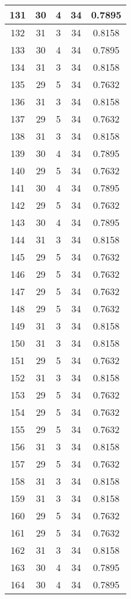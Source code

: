 \documentclass[letterpaper, 12pt]{article}
\begin{document}
\begin{longtable}{|c|c|c|c|c|}
\hline
131 & 30 & 4 & 34 & 0.7895 \\
\hline
132 & 31 & 3 & 34 & 0.8158 \\
\hline
133 & 30 & 4 & 34 & 0.7895 \\
\hline
134 & 31 & 3 & 34 & 0.8158 \\
\hline
135 & 29 & 5 & 34 & 0.7632 \\
\hline
136 & 31 & 3 & 34 & 0.8158 \\
\hline
137 & 29 & 5 & 34 & 0.7632 \\
\hline
138 & 31 & 3 & 34 & 0.8158 \\
\hline
139 & 30 & 4 & 34 & 0.7895 \\
\hline
140 & 29 & 5 & 34 & 0.7632 \\
\hline
141 & 30 & 4 & 34 & 0.7895 \\
\hline
142 & 29 & 5 & 34 & 0.7632 \\
\hline
143 & 30 & 4 & 34 & 0.7895 \\
\hline
144 & 31 & 3 & 34 & 0.8158 \\
\hline
145 & 29 & 5 & 34 & 0.7632 \\
\hline
146 & 29 & 5 & 34 & 0.7632 \\
\hline
147 & 29 & 5 & 34 & 0.7632 \\
\hline
148 & 29 & 5 & 34 & 0.7632 \\
\hline
149 & 31 & 3 & 34 & 0.8158 \\
\hline
150 & 31 & 3 & 34 & 0.8158 \\
\hline
151 & 29 & 5 & 34 & 0.7632 \\
\hline
152 & 31 & 3 & 34 & 0.8158 \\
\hline
153 & 29 & 5 & 34 & 0.7632 \\
\hline
154 & 29 & 5 & 34 & 0.7632 \\
\hline
155 & 29 & 5 & 34 & 0.7632 \\
\hline
156 & 31 & 3 & 34 & 0.8158 \\
\hline
157 & 29 & 5 & 34 & 0.7632 \\
\hline
158 & 31 & 3 & 34 & 0.8158 \\
\hline
159 & 31 & 3 & 34 & 0.8158 \\
\hline
160 & 29 & 5 & 34 & 0.7632 \\
\hline
161 & 29 & 5 & 34 & 0.7632 \\
\hline
162 & 31 & 3 & 34 & 0.8158 \\
\hline
163 & 30 & 4 & 34 & 0.7895 \\
\hline
164 & 30 & 4 & 34 & 0.7895 \\

\end{longtable}
\end{document}
